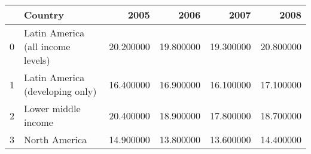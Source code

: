 \begin{tabular}{llrrrr}
\toprule
 & Country & 2005 & 2006 & 2007 & 2008 \\
\midrule
0 & Latin America (all income levels) & 20.200000 & 19.800000 & 19.300000 & 20.800000 \\
1 & Latin America (developing only) & 16.400000 & 16.900000 & 16.100000 & 17.100000 \\
2 & Lower middle income & 20.400000 & 18.900000 & 17.800000 & 18.700000 \\
3 & North America & 14.900000 & 13.800000 & 13.600000 & 14.400000 \\
\bottomrule
\end{tabular}
